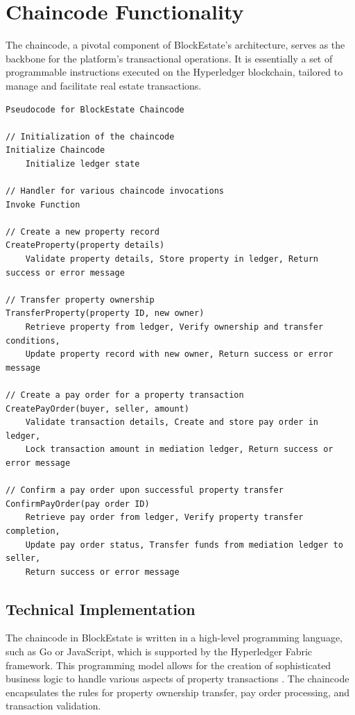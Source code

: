 \documentclass[3p,times]{elsarticle}
\begin{document}
\section{Chaincode Functionality}

The chaincode, a pivotal component of BlockEstate's architecture, serves as the backbone for the platform's transactional operations. It is essentially a set of programmable instructions executed on the Hyperledger blockchain, tailored to manage and facilitate real estate transactions.

\begin{verbatim}
Pseudocode for BlockEstate Chaincode

// Initialization of the chaincode
Initialize Chaincode
    Initialize ledger state

// Handler for various chaincode invocations
Invoke Function

// Create a new property record
CreateProperty(property details)
    Validate property details, Store property in ledger, Return success or error message

// Transfer property ownership
TransferProperty(property ID, new owner)
    Retrieve property from ledger, Verify ownership and transfer conditions, 
    Update property record with new owner, Return success or error message

// Create a pay order for a property transaction
CreatePayOrder(buyer, seller, amount)
    Validate transaction details, Create and store pay order in ledger, 
    Lock transaction amount in mediation ledger, Return success or error message

// Confirm a pay order upon successful property transfer
ConfirmPayOrder(pay order ID)
    Retrieve pay order from ledger, Verify property transfer completion,
    Update pay order status, Transfer funds from mediation ledger to seller, 
    Return success or error message

\end{verbatim}

\subsection{Technical Implementation}

The chaincode in BlockEstate is written in a high-level programming language, such as Go or JavaScript, which is supported by the Hyperledger Fabric framework. This programming model allows for the creation of sophisticated business logic to handle various aspects of property transactions \cite{veuger2020database}. The chaincode encapsulates the rules for property ownership transfer, pay order processing, and transaction validation.
\end{document}
